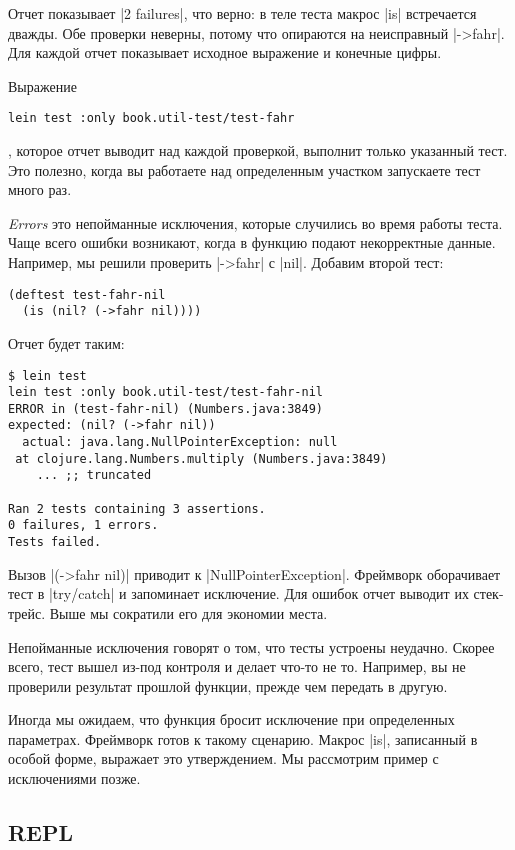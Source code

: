Отчет показывает \spverb|2 failures|, что верно: в теле теста макрос \spverb|is|
встречается дважды. Обе проверки неверны, потому что опираются на неисправный
\spverb|->fahr|. Для каждой отчет показывает исходное выражение и конечные
цифры.

Выражение

\begin{verbatim}
lein test :only book.util-test/test-fahr
\end{verbatim}

\noindent
, которое отчет выводит над каждой проверкой, выполнит только указанный
тест. Это полезно, когда вы работаете над определенным участком запускаете тест
много раз.

\emph{Errors} это непойманные исключения, которые случились во время работы
теста. Чаще всего ошибки возникают, когда в функцию подают некорректные
данные. Например, мы решили проверить \spverb|->fahr| с \spverb|nil|. Добавим
второй тест:

\begin{verbatim}
(deftest test-fahr-nil
  (is (nil? (->fahr nil))))
\end{verbatim}

Отчет будет таким:

\begin{verbatim}
$ lein test
lein test :only book.util-test/test-fahr-nil
ERROR in (test-fahr-nil) (Numbers.java:3849)
expected: (nil? (->fahr nil))
  actual: java.lang.NullPointerException: null
 at clojure.lang.Numbers.multiply (Numbers.java:3849)
    ... ;; truncated

Ran 2 tests containing 3 assertions.
0 failures, 1 errors.
Tests failed.
\end{verbatim}

Вызов \spverb|(->fahr nil)| приводит к \spverb|NullPointerException|. Фреймворк
оборачивает тест в \spverb|try/catch| и запоминает исключение. Для ошибок отчет
выводит их стек-трейс. Выше мы сократили его для экономии места.

Непойманные исключения говорят о том, что тесты устроены неудачно. Скорее всего,
тест вышел из-под контроля и делает что-то не то. Например, вы не проверили
результат прошлой функции, прежде чем передать в другую.

Иногда мы ожидаем, что функция бросит исключение при определенных
параметрах. Фреймворк готов к такому сценарию. Макрос \spverb|is|, записанный в
особой форме, выражает это утверждением. Мы рассмотрим пример с исключениями
позже.

\subsection{REPL}

